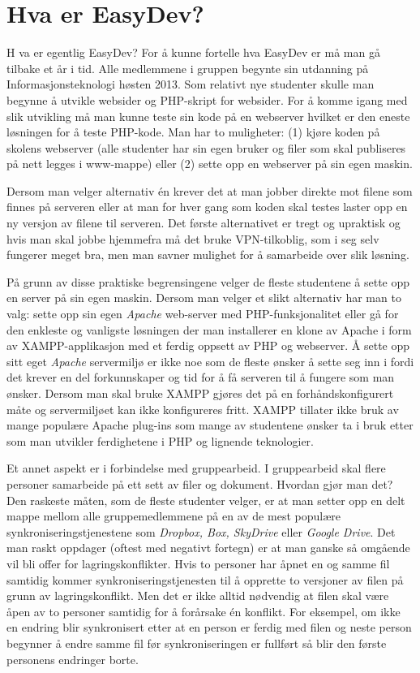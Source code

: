 \chapter{Hva er EasyDev?} \label{sec:hvaereasydev}

\lettrine[lines=2]{H}{} va er egentlig EasyDev? For å kunne fortelle hva EasyDev er må man gå tilbake et år i tid. Alle medlemmene i gruppen begynte sin utdanning på Informasjonsteknologi høsten 2013. Som relativt nye studenter skulle man begynne å utvikle websider og PHP-skript for websider. For å komme igang med slik utvikling må man kunne teste sin kode på en webserver hvilket er den eneste løsningen for å teste PHP-kode. 
Man har to muligheter: (1) kjøre koden på skolens webserver (alle studenter har sin egen bruker og filer som skal publiseres på nett legges i www-mappe) eller (2) sette opp en webserver på sin egen maskin.

Dersom man velger alternativ én krever det at man jobber direkte mot filene som finnes på serveren eller at man for hver gang som koden skal testes laster opp en ny versjon av filene til serveren. Det første alternativet er tregt og upraktisk og hvis man skal jobbe hjemmefra må det bruke VPN-tilkoblig, som i seg selv fungerer meget bra, men man savner mulighet for å samarbeide over slik løsning.

På grunn av disse praktiske begrensingene velger de fleste studentene å sette opp en server på sin egen maskin. Dersom man velger et slikt alternativ har man to valg: sette opp sin egen \textit{Apache} web-server med PHP-funksjonalitet eller gå for den enkleste og vanligste løsningen der man installerer en klone av Apache i form av XAMPP-applikasjon med et ferdig oppsett av PHP og webserver. Å sette opp sitt eget \textit{Apache} servermiljø er ikke noe som de fleste ønsker å sette seg inn i fordi det krever en del forkunnskaper og tid for å få serveren til å fungere som man ønsker. Dersom man skal bruke XAMPP gjøres det på en forhåndskonfigurert måte og servermiljøet kan ikke konfigureres fritt. XAMPP tillater ikke bruk av mange populære Apache plug-ins som mange av studentene ønsker ta i bruk etter som man utvikler ferdighetene i PHP og lignende teknologier.

Et annet aspekt er i forbindelse med gruppearbeid. I gruppearbeid skal flere personer samarbeide på ett sett av filer og dokument. Hvordan gjør man det? Den raskeste måten, som de fleste studenter velger, er at man setter opp en delt mappe mellom alle gruppemedlemmene på en av de mest populære synkroniseringstjenestene som \textit{Dropbox, Box, SkyDrive} eller \textit{Google Drive}. Det man raskt oppdager (oftest med negativt fortegn) er at man ganske så omgående vil bli offer for lagringskonflikter. Hvis to personer har åpnet en og samme fil samtidig kommer synkroniseringstjenesten til å opprette to versjoner av filen på grunn av lagringskonflikt. 
Men det er ikke alltid nødvendig at filen skal være åpen av to personer samtidig for å forårsake én konflikt. For eksempel, om ikke en endring blir synkronisert etter at en person er ferdig med filen og neste person begynner å endre samme fil før synkroniseringen er fullført så blir den første personens endringer borte. 

